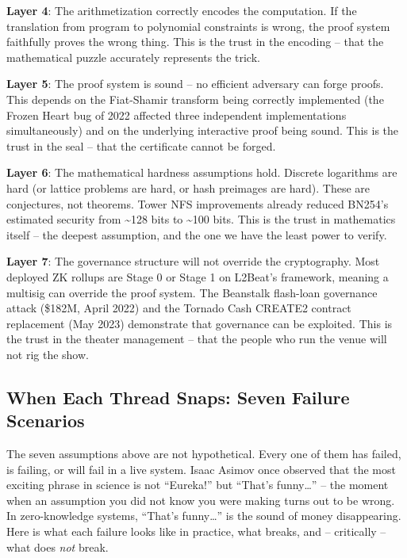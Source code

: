 \documentclass[
  11pt,
  openany]{report}
\renewcommand{\textbf}[1]{{\bfseries\color{MidnightBold}#1}}
\begin{document}
\textbf{Layer 4}: The arithmetization correctly encodes the computation. If the
translation from program to polynomial constraints is wrong, the proof system
faithfully proves the wrong thing. This is the trust in the encoding -- that the
mathematical puzzle accurately represents the trick.

\textbf{Layer 5}: The proof system is sound -- no efficient adversary can forge
proofs. This depends on the Fiat-Shamir transform being correctly implemented
(the Frozen Heart bug of 2022 affected three independent implementations
simultaneously) and on the underlying interactive proof being sound. This is the
trust in the seal -- that the certificate cannot be forged.

\textbf{Layer 6}: The mathematical hardness assumptions hold. Discrete
logarithms are hard (or lattice problems are hard, or hash preimages are hard).
These are conjectures, not theorems. Tower NFS improvements already reduced
BN254's estimated security from \textasciitilde128 bits to \textasciitilde100
bits. This is the trust in mathematics itself -- the deepest assumption, and the
one we have the least power to verify.

\textbf{Layer 7}: The governance structure will not override the cryptography.
Most deployed ZK rollups are Stage 0 or Stage 1 on L2Beat's framework, meaning a
multisig can override the proof system. The Beanstalk flash-loan governance
attack (\$182M, April 2022) and the Tornado Cash CREATE2 contract replacement
(May 2023) demonstrate that governance can be exploited. This is the trust in
the theater management -- that the people who run the venue will not rig the
show.

\subsection{When Each Thread Snaps: Seven Failure
Scenarios}\label{when-each-thread-snaps-seven-failure-scenarios}

The seven assumptions above are not hypothetical. Every one of them has failed,
is failing, or will fail in a live system. Isaac Asimov once observed that the
most exciting phrase in science is not ``Eureka!'' but ``That's funny\ldots{}''
-- the moment when an assumption you did not know you were making turns out to
be wrong. In zero-knowledge systems, ``That's funny\ldots{}'' is the sound of
money disappearing. Here is what each failure looks like in practice, what
breaks, and -- critically -- what does \emph{not} break.
\end{document}
